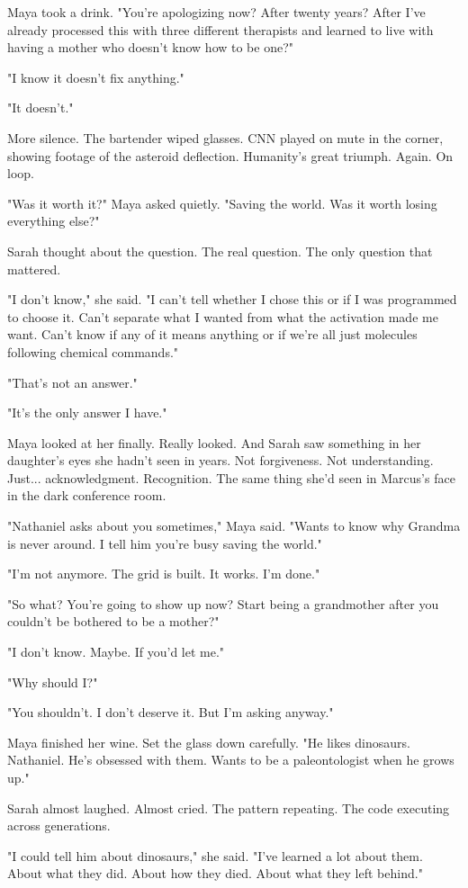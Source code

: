 Maya took a drink. "You're apologizing now? After twenty years? After I've already processed this with three different therapists and learned to live with having a mother who doesn't know how to be one?"

"I know it doesn't fix anything."

"It doesn't."

More silence. The bartender wiped glasses. CNN played on mute in the corner, showing footage of the asteroid deflection. Humanity's great triumph. Again. On loop.

"Was it worth it?" Maya asked quietly. "Saving the world. Was it worth losing everything else?"

Sarah thought about the question. The real question. The only question that mattered.

"I don't know," she said. "I can't tell whether I chose this or if I was programmed to choose it. Can't separate what I wanted from what the activation made me want. Can't know if any of it means anything or if we're all just molecules following chemical commands."

"That's not an answer."

"It's the only answer I have."

Maya looked at her finally. Really looked. And Sarah saw something in her daughter's eyes she hadn't seen in years. Not forgiveness. Not understanding. Just... acknowledgment. Recognition. The same thing she'd seen in Marcus's face in the dark conference room.

"Nathaniel asks about you sometimes," Maya said. "Wants to know why Grandma is never around. I tell him you're busy saving the world."

"I'm not anymore. The grid is built. It works. I'm done."

"So what? You're going to show up now? Start being a grandmother after you couldn't be bothered to be a mother?"

"I don't know. Maybe. If you'd let me."

"Why should I?"

"You shouldn't. I don't deserve it. But I'm asking anyway."

Maya finished her wine. Set the glass down carefully. "He likes dinosaurs. Nathaniel. He's obsessed with them. Wants to be a paleontologist when he grows up."

Sarah almost laughed. Almost cried. The pattern repeating. The code executing across generations.

"I could tell him about dinosaurs," she said. "I've learned a lot about them. About what they did. About how they died. About what they left behind."

